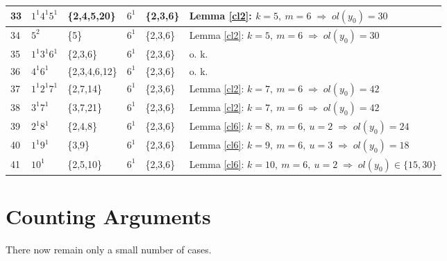 {{\begin{flushleft}
{\begin{tabular}{||l|l|l|l|l|l||}
    33     & $1^{1}4^{1}5^{1}$     & {\scriptsize \{2,4,5,20\}}& $6^{1}$      &  {\scriptsize \{2,3,6\}}     & {\scriptsize Lemma \ref{cl2}: $k=5, \ m=6 \; {\Rightarrow} \; ol(y_{0})=30$} \\ \hline 
    34     & $5^{2}$            & {\scriptsize \{5\}}& $6^{1}$      &   {\scriptsize \{2,3,6\}}     & {\scriptsize Lemma \ref{cl2}: $k=5, \ m=6 \; {\Rightarrow} \; ol(y_{0})=30$} \\ \hline 
    35     & $1^{1}3^{1}6^{1}$     &  {\scriptsize \{2,3,6\}}& $6^{1}$      &  {\scriptsize \{2,3,6\}}   & {\scriptsize o. k.}\\ \hline      
    36     & $4^{1}6^{1}$          &{\scriptsize \{2,3,4,6,12\}} & $6^{1}$      &  {\scriptsize \{2,3,6\}}  & {\scriptsize o. k.}\\ \hline
    37     & $1^{1}2^{1}7^{1}$     & {\scriptsize \{2,7,14\}}  & $6^{1}$      &  {\scriptsize \{2,3,6\}}     & {\scriptsize Lemma \ref{cl2}: $k=7, \ m=6 \; {\Rightarrow} \; ol(y_{0})=42$} \\ \hline 
    38     & $3^{1}7^{1}$          & {\scriptsize \{3,7,21\}}  & $6^{1}$      &  {\scriptsize \{2,3,6\}}     & {\scriptsize Lemma \ref{cl2}: $k=7, \ m=6 \; {\Rightarrow} \; ol(y_{0})=42$} \\ \hline 
    39     & $2^{1}8^{1}$          & {\scriptsize \{2,4,8\}}   & $6^{1}$      &{\scriptsize \{2,3,6\}} & {\scriptsize Lemma \ref{cl6}: $k=8, \ m=6, \ u=2 \; {\Rightarrow} \; ol(y_{0})=24$} \\ \hline 
    40     & $1^{1}9^{1}$          &  {\scriptsize \{3,9\}}    & $6^{1}$      &  {\scriptsize \{2,3,6\}}  & {\scriptsize Lemma \ref{cl6}: $k=9, \ m=6, \ u=3  \; {\Rightarrow} \; ol(y_{0})=18 $} \\ \hline            
    41     & $10^{1}$              & {\scriptsize  \{2,5,10\}} & $6^{1}$      &{\scriptsize \{2,3,6\}} & {\scriptsize Lemma \ref{cl6}: $k=10, \ m=6, \ u=2  \; {\Rightarrow} \; ol(y_{0}) \in \{15,30\}$} \\ \hline 

\end{tabular}
}
\end{flushleft}

	   

\section{ Counting Arguments} \label{sec5}

There now remain only a small number of cases.\\

}}
